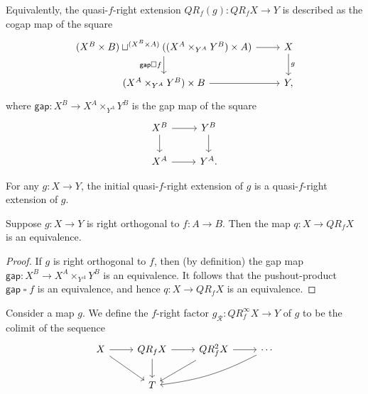 \begin{rmk}
Equivalently, the quasi-$f$-right extension $QR_f(g):QR_f X \to Y$ is described as the cogap map of the square
\begin{equation*}
\begin{tikzcd}
(X^B\times B)\sqcup^{(X^B\times A)}((X^A\times_{Y^A} Y^B)\times A) \arrow[d,swap,"\mathsf{gap}\mathbin{\square} f"] \arrow[r] & X \arrow[d,"g"] \\
(X^A\times_{Y^A} Y^B)\times B \arrow[r] & Y,
\end{tikzcd}
\end{equation*}
where $\mathsf{gap}:X^B \to X^A\times_{Y^A} Y^B$ is the gap map of the square
\begin{equation*}
\begin{tikzcd}
X^B \arrow[r] \arrow[d] & Y^B \arrow[d] \\
X^A \arrow[r] & Y^A.
\end{tikzcd}
\end{equation*}
\end{rmk}

\begin{lem}
For any $g:X\to Y$, the initial quasi-$f$-right extension of $g$ is a quasi-$f$-right extension of $g$.
\end{lem}

\begin{lem}
Suppose $g:X\to Y$ is right orthogonal to $f:A\to B$. Then the map $q:X\to QR_fX$ is an equivalence.
\end{lem}

\begin{proof}
If $g$ is right orthogonal to $f$, then (by definition) the gap map $\mathsf{gap}:X^B\to X^A\times_{Y^A} Y^B$ is an equivalence. It follows that the pushout-product $\mathsf{gap}\mathbin{\square} f$ is an equivalence, and hence $q:X\to QR_f X$ is an equivalence.
\end{proof}

\begin{defn}
Consider a map $g$. We define the $f$-right factor $g_\mathcal{R}:QR_f^{\infty} X\to Y$ of $g$ to be the colimit of the sequence
\begin{equation*}
\begin{tikzcd}
X \arrow[dr] \arrow[r] & QR_fX \arrow[d] \arrow[r] & QR_f^2 X \arrow[ld] \arrow[r] & \cdots \arrow[dll,bend left=10] \\
& T
\end{tikzcd}
\end{equation*}
\end{defn}

